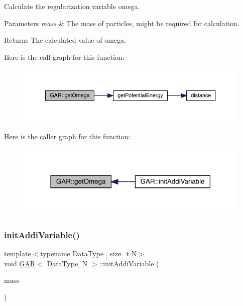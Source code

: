 Calculate the regularization variable omega. 


\begin{DoxyParams}{Parameters}
{\em mass} & The mass of particles, might be required for calculation. \\
\hline
\end{DoxyParams}
\begin{DoxyReturn}{Returns}
The calculated value of omega. 
\end{DoxyReturn}
Here is the call graph for this function\+:\nopagebreak
\begin{figure}[H]
\begin{center}
\leavevmode
\includegraphics[width=350pt]{class_g_a_r_a3d5871f25d147497399fa65343bca84a_cgraph}
\end{center}
\end{figure}
Here is the caller graph for this function\+:\nopagebreak
\begin{figure}[H]
\begin{center}
\leavevmode
\includegraphics[width=318pt]{class_g_a_r_a3d5871f25d147497399fa65343bca84a_icgraph}
\end{center}
\end{figure}
\mbox{\label{class_g_a_r_a31b5ad2527cc52d1422fa11e2d93fbc6}} 
\subsubsection{\texorpdfstring{init\+Addi\+Variable()}{initAddiVariable()}}
{\footnotesize\ttfamily template$<$typename Data\+Type , size\+\_\+t N$>$ \\
void \mbox{\hyperlink{class_g_a_r}{G\+AR}}$<$ Data\+Type, N $>$\+::init\+Addi\+Variable (\begin{DoxyParamCaption}\item[{\mbox{\hyperlink{class_g_a_r_a0b446684ae922457a3bf86c904085d8a}{Scalar\+Array}} \&}]{mass }\end{DoxyParamCaption})\hspace{0.3cm}{\ttfamily [inline]}}



